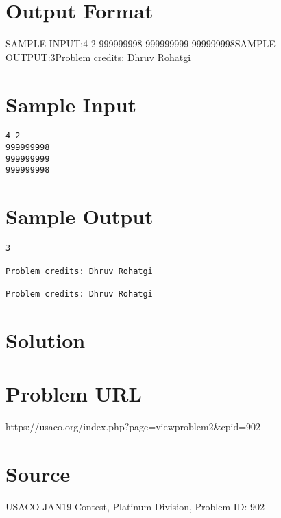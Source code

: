 \documentclass[12pt]{article}
\begin{document}
\section*{Output Format}
SAMPLE INPUT:4 2
999999998
999999999
999999998SAMPLE OUTPUT:3Problem credits: Dhruv Rohatgi

\section*{Sample Input}
\begin{verbatim}
4 2
999999998
999999999
999999998
\end{verbatim}

\section*{Sample Output}
\begin{verbatim}
3

Problem credits: Dhruv Rohatgi

Problem credits: Dhruv Rohatgi
\end{verbatim}

\section*{Solution}


\section*{Problem URL}
https://usaco.org/index.php?page=viewproblem2&cpid=902

\section*{Source}
USACO JAN19 Contest, Platinum Division, Problem ID: 902
\end{document}
